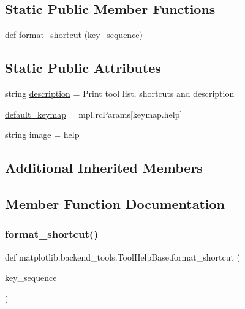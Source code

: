 \subsection*{Static Public Member Functions}
\begin{DoxyCompactItemize}
\item 
def \hyperlink{classmatplotlib_1_1backend__tools_1_1ToolHelpBase_ac91430bd419326159c2ae7b7bee8c7df}{format\+\_\+shortcut} (key\+\_\+sequence)
\end{DoxyCompactItemize}
\subsection*{Static Public Attributes}
\begin{DoxyCompactItemize}
\item 
string \hyperlink{classmatplotlib_1_1backend__tools_1_1ToolHelpBase_ab71ed7761913008a901f2ea7eea72d3a}{description} = \textquotesingle{}Print tool list, shortcuts and description\textquotesingle{}
\item 
\hyperlink{classmatplotlib_1_1backend__tools_1_1ToolHelpBase_a0a23819ca9e716f0090ec896bea4dcbc}{default\+\_\+keymap} = mpl.\+rc\+Params\mbox{[}\textquotesingle{}keymap.\+help\textquotesingle{}\mbox{]}
\item 
string \hyperlink{classmatplotlib_1_1backend__tools_1_1ToolHelpBase_a114184c18fbff6d5148f741313730a0e}{image} = \textquotesingle{}help\textquotesingle{}
\end{DoxyCompactItemize}
\subsection*{Additional Inherited Members}


\subsection{Member Function Documentation}
\mbox{\label{classmatplotlib_1_1backend__tools_1_1ToolHelpBase_ac91430bd419326159c2ae7b7bee8c7df}} 
\subsubsection{\texorpdfstring{format\+\_\+shortcut()}{format\_shortcut()}}
{\footnotesize\ttfamily def matplotlib.\+backend\+\_\+tools.\+Tool\+Help\+Base.\+format\+\_\+shortcut (\begin{DoxyParamCaption}\item[{}]{key\+\_\+sequence }\end{DoxyParamCaption})\hspace{0.3cm}{\ttfamily [static]}}

